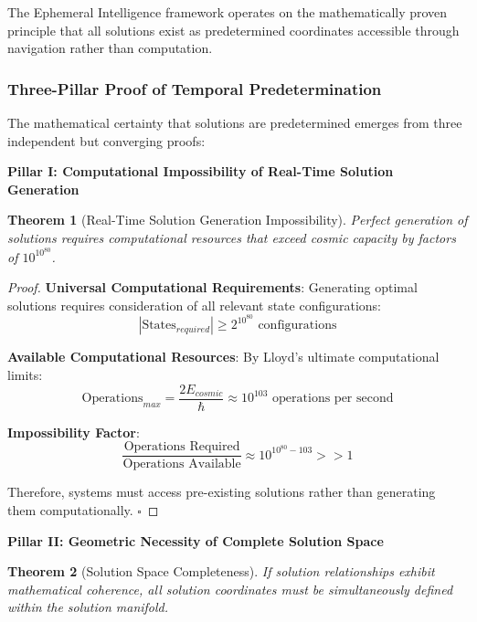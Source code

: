 \documentclass[12pt,a4paper]{article}
\newtheorem{theorem}{Theorem}
\begin{document}
The Ephemeral Intelligence framework operates on the mathematically proven principle that all solutions exist as predetermined coordinates accessible through navigation rather than computation.

\subsubsection{Three-Pillar Proof of Temporal Predetermination}

The mathematical certainty that solutions are predetermined emerges from three independent but converging proofs:

\textbf{Pillar I: Computational Impossibility of Real-Time Solution Generation}

\begin{theorem}[Real-Time Solution Generation Impossibility]
Perfect generation of solutions requires computational resources that exceed cosmic capacity by factors of $10^{10^{80}}$.
\end{theorem}

\begin{proof}
\textbf{Universal Computational Requirements}: Generating optimal solutions requires consideration of all relevant state configurations:
\begin{equation}
|\text{States}_{required}| \geq 2^{10^{80}} \text{ configurations}
\end{equation}

\textbf{Available Computational Resources}: By Lloyd's ultimate computational limits:
\begin{equation}
\text{Operations}_{max} = \frac{2E_{cosmic}}{\hbar} \approx 10^{103} \text{ operations per second}
\end{equation}

\textbf{Impossibility Factor}:
\begin{equation}
\frac{\text{Operations Required}}{\text{Operations Available}} \approx 10^{10^{80}-103} >> 1
\end{equation}

Therefore, systems must access pre-existing solutions rather than generating them computationally. $\square$
\end{proof}

\textbf{Pillar II: Geometric Necessity of Complete Solution Space}

\begin{theorem}[Solution Space Completeness]
If solution relationships exhibit mathematical coherence, all solution coordinates must be simultaneously defined within the solution manifold.
\end{theorem}
\end{document}

